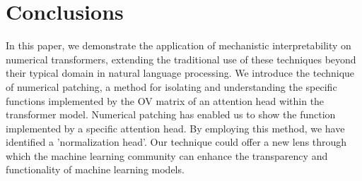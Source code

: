 \documentclass{article}
\begin{document}
\section{Conclusions}
In this paper, we demonstrate the application of mechanistic interpretability on numerical transformers, extending the traditional use of these techniques beyond their typical domain in natural language processing. We introduce the technique of numerical patching, a method for isolating and understanding the specific functions implemented by the OV matrix of an attention head within the transformer model. Numerical patching has enabled us to show the function implemented by a specific attention head. By employing this method, we have identified a 'normalization head'. Our technique could offer a new lens through which the machine learning community can enhance the transparency and functionality of machine learning models.





\newpage
\end{document}
